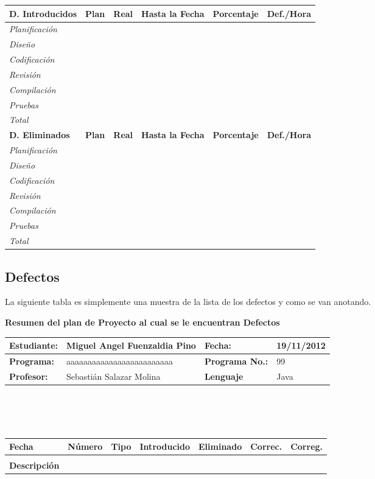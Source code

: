\documentclass[a4paper,12pt,openany,oneside]{book}
\begin{document}
\newpage
\begin{tabular}{| l | l | l | l | l | l |}
\hline
\textbf{D. Introducidos} & \textbf{Plan} & \textbf{Real} & \textbf{Hasta la Fecha} & \textbf{Porcentaje} & \textbf{Def./Hora} \\
\hline
\textit{Planificación} & & & & & \\
\hline
\textit{Diseño} & & & & & \\
\hline
\textit{Codificación} & & & & & \\
\hline
\textit{Revisión} & & & & & \\
\hline
\textit{Compilación} & & & & & \\
\hline
\textit{Pruebas} & & & & & \\
\hline
\textit{Total} & & & & & \\
\hline
\textbf{D. Eliminados} & \textbf{Plan} & \textbf{Real} & \textbf{Hasta la Fecha} & \textbf{Porcentaje} & \textbf{Def./Hora} \\
\hline
\textit{Planificación} & & & & & \\
\hline
\textit{Diseño} & & & & & \\
\hline
\textit{Codificación} & & & & & \\
\hline
\textit{Revisión} & & & & & \\
\hline
\textit{Compilación} & & & & & \\
\hline
\textit{Pruebas} & & & & & \\
\hline
\textit{Total} & & & & & \\
\hline
\end{tabular}
\subsection{Defectos}
La siguiente tabla es simplemente una muestra de la lista de los defectos y como se van anotando.

\textbf{Resumen del plan de Proyecto al cual se le encuentran Defectos}\\
\begin{tabular}{| l | l | l | l |}
\hline
\textbf{Estudiante:} & Miguel Angel Fuenzaldia Pino & \textbf{Fecha:} & 19/11/2012\\
\hline
\textbf{Programa:} & aaaaaaaaaaaaaaaaaaaaaaaaa & \textbf{Programa No.:} & 99\\
\hline
\textbf{Profesor:} & Sebastián Salazar Molina & \textbf{Lenguaje} & Java  \\
\hline
\end{tabular}
\\\\\\
\begin{tabular}{| l | l | l | l | l | l | l |}
\hline
\textbf{Fecha} & \textbf{Número} & \textbf{Tipo} & \textbf{Introducido} & \textbf{Eliminado} & \textbf{Correc.} & \textbf{Correg.}\\
\hline
 & & & & & & \\
\hline
\textbf{Descripción} & \multicolumn{6}{|c|}{} \\
\hline
\end{tabular}


\end{document}
